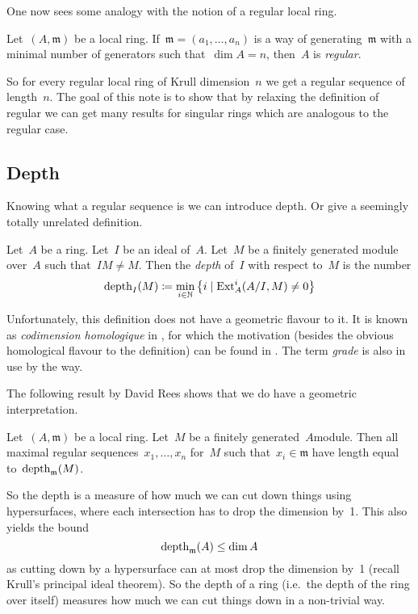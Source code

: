 \documentclass[10pt,a4paper]{article}
\begin{document}
One now sees some analogy with the notion of a regular local ring.
\begin{definition}
  Let~$(A,\mathfrak{m})$ be a local ring. If~$\mathfrak{m}=(a_1,\dotsc,a_n)$ is a way of generating~$\mathfrak{m}$ with a minimal number of generators such that~$\dim A=n$, then~$A$ is \emph{regular}.
\end{definition}
So for every regular local ring of Krull dimension~$n$ we get a regular sequence of length~$n$. The goal of this note is to show that by relaxing the definition of regular we can get many results for singular rings which are analogous to the regular case.

\subsection{Depth}
\label{subsection:depth}
Knowing what a regular sequence is we can introduce depth. Or give a seemingly totally unrelated definition.
\begin{definition}
  Let~$A$ be a ring. Let~$I$ be an ideal of~$A$. Let~$M$ be a finitely generated module over~$A$ such that~$IM\neq M$. Then the \emph{depth} of~$I$ with respect to~$M$ is the number
  \begin{equation}
    \operatorname{depth}_I(M)\coloneqq\min_{i\in\mathbb{N}}\left\{ i\mid\operatorname{Ext}_A^i(A/I,M)\neq 0 \right\}
  \end{equation}
\end{definition}
Unfortunately, this definition does not have a geometric flavour to it. It is known as \emph{codimension homologique} in \cite{serre-algebre-locale}, for which the motivation (besides the obvious homological flavour to the definition) can be found in \cite[proposition 21]{serre-algebre-locale}. The term \emph{grade} is also in use by the way.

The following result by David Rees shows that we do have a geometric interpretation.
\begin{theorem}
  Let~$(A,\mathfrak{m})$ be a local ring. Let~$M$ be a finitely generated~$A$\dash module. Then all maximal regular sequences~$x_1,\dotsc,x_n$ for~$M$ such that~$x_i\in\mathfrak{m}$ have length equal to~$\operatorname{depth}_{\mathfrak{m}}(M)$.
\end{theorem}
So the depth is a measure of how much we can cut down things using hypersurfaces, where each intersection has to drop the dimension by~1. This also yields the bound
\begin{equation}
  \label{equation:depth-dim-inequality}
  \operatorname{depth}_{\mathfrak{m}}(A)\leq\dim A
\end{equation}
as cutting down by a hypersurface can at most drop the dimension by~1 (recall Krull's principal ideal theorem). So the depth of a ring (i.e.\ the depth of the ring over itself) measures how much we can cut things down in a non-trivial way.
\end{document}
